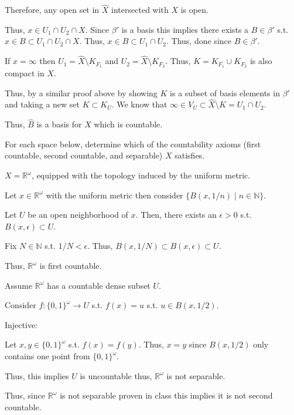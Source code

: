 \documentclass[12pt, letterpaper]{article}
\newcommand{\R}{\mathbb{R}}
\newcommand{\N}{\mathbb{N}}
\begin{document}
\begin{problemproof}
    Therefore, any open set in $\hat{X}$ intersected with $X$ is open.

    Thus, $x \in U_1 \cap U_2 \cap X$. Since $\beta'$ is a basis this implies there exists a $B \in \beta'$ s.t. $x \in B \subset U_1 \cap U_2 \cap X$. Thus, $x \in B \subset U_1 \cap U_2$. Thus, done since $B \in \beta'$.

    If $x =\infty$ then $U_1 = \hat{X} \setminus K_{F_1}$ and $U_2 = \hat{X} \setminus K_{F_2}$. Thus, $K=K_{F_1} \cup K_{F_2}$ is also compact in $X$.

    Thus, by a similar proof above by showing $K$ is a subset of basis elements in $\beta'$ and taking a new set $K \subset K_U$. We know that $\infty \in V_U \subset \hat{X} \setminus K=U_1 \cap U_2$.

    Thus, $\hat{B}$ is a basis for $\hat{X}$ which is countable.
\end{problemproof}

\begin{problem}{}
    For each space below, determine which of the countability axioms
    (first countable, second countable, and separable) $X$ satisfies.
\end{problem}
\begin{subproblem}{}
    $X = \R^\omega$, equipped with the topology induced by the
    uniform metric.
\end{subproblem}
\begin{problemproof}
    Let $x \in \R^\omega$ with the uniform metric then consider $\{B(x,1/n) \mid n \in \N\}$.

    Let $U$ be an open neighborhood of $x$. Then, there exists an $\epsilon >0$ s.t. $B(x,\epsilon) \subset U$.

    Fix $N \in \N$ s.t. $1/N < \epsilon$. Thus, $B(x,1/N) \subset B(x,\epsilon) \subset U$.

    Thus, $\R^\omega$ is first countable.

    Assume $\R^\omega$ has a countable dense subset $U$.

    Consider $f: \{0,1\}^\omega \to U$ s.t. $f(x)=u$ s.t. $u \in B(x,1/2)$.

    Injective:

    Let $x,y \in \{0,1\}^\omega$ s.t. $f(x)=f(y)$. Thus, $x=y$ since $B(x,1/2)$ only contains one point from $\{0,1\}^\omega$.

    Thus, this implies $U$ is uncountable thus, $\R^\omega$ is not separable.

    Thus, since $\R^\omega$ is not separable proven in class this implies it is not second countable.
\end{problemproof}
\end{document}
